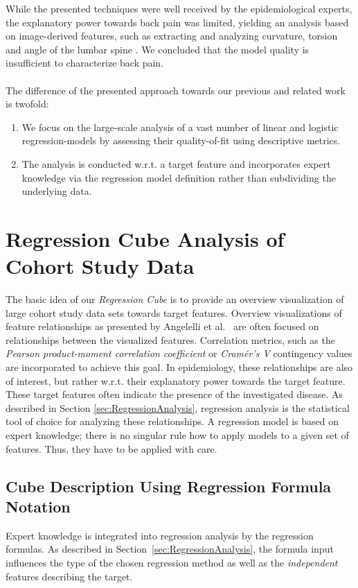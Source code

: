 \documentclass[journal]{style/vgtc} 			          %
\begin{document}
While the presented techniques were well received by the epidemiological experts, the explanatory power towards back pain was limited, yielding an analysis based on image-derived features, such as extracting and analyzing curvature, torsion and angle of the lumbar spine \cite{Klemm2015}.
We concluded that the model quality is insufficient to characterize back pain.
\\\\
The difference of the presented approach towards our previous and related work is twofold:
\begin{enumerate}
	\item We focus on the large-scale analysis of a vast number of linear and logistic regression-models by assessing their quality-of-fit using descriptive metrics.
	\item The analysis is conducted w.r.t. a target feature and incorporates expert knowledge via the regression model definition rather than subdividing the underlying data.
\end{enumerate}
\section{Regression Cube Analysis of Cohort Study Data}
The basic idea of our \emph{Regression Cube} is to provide an overview visualization of large cohort study data sets towards target features.
Overview visualizations of feature relationships as presented by Angelelli et al.~\cite{Angelelli} are often focused on relationships between the visualized features.
Correlation metrics, such as the \emph{Pearson product-moment correlation coefficient} or \emph{Cram\'{e}r's V} contingency values are incorporated to achieve this goal.
In epidemiology, these relationships are also of interest, but rather w.r.t. their explanatory power towards the target feature.
These target features often indicate the presence of the investigated disease.
As described in Section \ref{sec:RegressionAnalysis}, regression analysis is the statistical tool of choice for analyzing these relationships.
A regression model is based on expert knowledge; there is no singular rule how to apply models to a given set of features. Thus, they have to be applied with care.
\subsection{Cube Description Using Regression Formula Notation}
Expert knowledge is integrated into regression analysis by the regression formulas.
As described in Section~\ref{sec:RegressionAnalysis}, the formula input influences the type of the chosen regression method as well as the \emph{independent} features describing the target.
\end{document}
